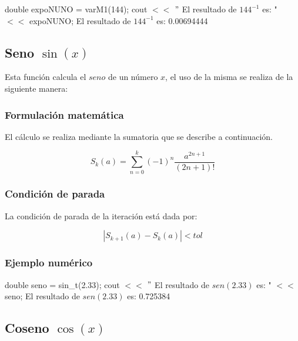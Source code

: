 \documentclass[10pt,a4paper]{article}
\begin{document}
	double expoNUNO = varM1(144); \newline
	cout $<<$ $"$ El resultado de $144^{-1}$ es: " $<<$ expoNUNO; \newline
	El resultado de $144^{-1}$ es: 0.00694444\newline

	\subsection{Seno $\sin(x)$}
	
	Esta función calcula el $seno$ de un número $x$, el uso de la misma se realiza de la siguiente manera:
	
	\begin{center}
	\end{center}
	
	\subsubsection{Formulación matemática}
	
	El cálculo se realiza mediante la sumatoria que se describe a continuación.
	
	\begin{equation}\label{key6}
		S_{k}(a) = \sum_{n=0}^{k}(-1)^{n}\frac{a^{2n + 1}}{(2n + 1)!}
	\end{equation}
	
	\subsubsection{Condición de parada}
	
	La condición de parada de la iteración está dada por: 
	
	\begin{equation}\label{key7}
		\left\lvert S_{k+1}(a) - S_{k}(a) \right\lvert < tol
	\end{equation}
	
	
	\subsubsection{Ejemplo numérico}
	
	double seno = sin{\_}t(2.33); \newline
	cout $<<$ $"$ El resultado de $sen(2.33)$ es: " $<<$ seno; \newline
	El resultado de $sen(2.33)$ es: 0.725384\newline

	\subsection{Coseno $\cos(x)$}
	
\end{document}
